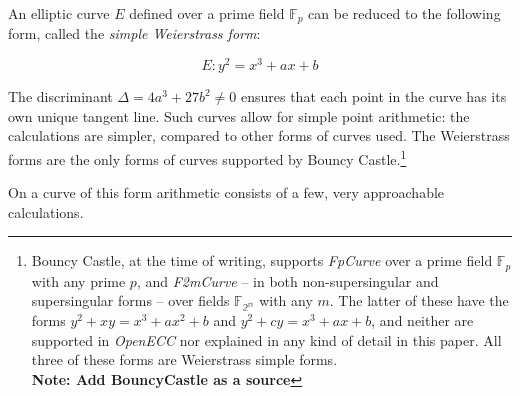 An elliptic curve \(E\) defined over a prime field \(\mathbb{F}_p\) can be reduced to the following form,
called the \emph{simple Weierstrass form}:

\begin{equation}
	E: y^2 = x^3 + ax + b
\end{equation}

The discriminant \(\Delta = 4a^3 + 27b^2 \neq 0\) ensures that each point in the curve has its own
unique tangent line. Such curves allow for simple point arithmetic: the
calculations are simpler, compared to other forms of curves used. The Weierstrass forms are
the only forms of curves supported by Bouncy Castle.\footnote{Bouncy Castle, at the time of writing,
supports \emph{FpCurve} over a prime field \(\mathbb{F}_p\) with any prime \(p\), and \emph{F2mCurve}
-- in both non-supersingular and supersingular forms -- over fields \(\mathbb{F_{2^m}}\) with any \(m\).
The latter of these have the forms \(y^2 + xy = x^3 + ax^2 + b\) and
\(y^2 + cy = x^3 + ax + b\), and neither are supported in \emph{OpenECC} nor explained in any kind
of detail in this paper. All three of these forms are Weierstrass simple forms.\\ \textbf{Note: Add BouncyCastle
as a source}}

On a curve of this form arithmetic consists of a few, very approachable calculations.